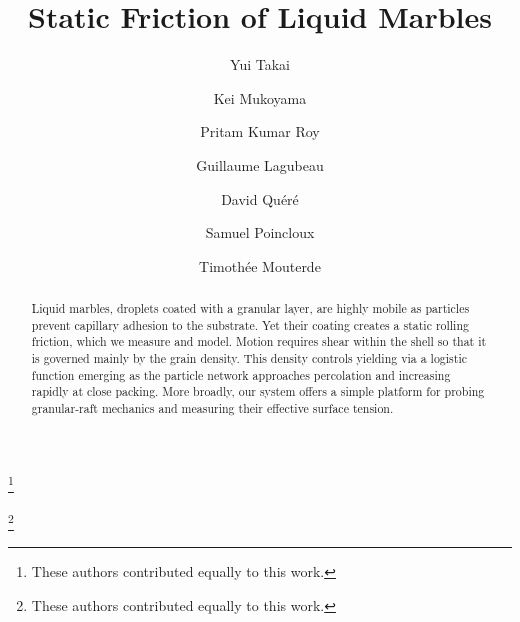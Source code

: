 \documentclass[twocolumn, prl,
 amsmath,amssymb,
 superscriptaddress,aps,
]{revtex4-2}
\begin{document}
\title{Static Friction of Liquid Marbles}

\author{Yui Takai}
\thanks{These authors contributed equally to this work.}

\author{Kei Mukoyama}
\thanks{These authors contributed equally to this work.}

\author{Pritam Kumar Roy}

\author{Guillaume Lagubeau}

\author{David Quéré}

\author{Samuel Poincloux}


\author{Timothée Mouterde}



\begin{abstract}
Liquid marbles, droplets coated with a granular layer, are highly mobile as particles prevent capillary adhesion to the substrate. Yet their coating creates a static rolling friction, which we measure and model. Motion requires shear within the shell so that it is governed mainly by the grain density. This density controls yielding via a logistic function emerging as the particle network approaches percolation and increasing rapidly at close packing. More broadly, our system offers a simple platform for probing granular-raft mechanics and measuring their effective surface tension.

\end{abstract}


\maketitle
\end{document}
